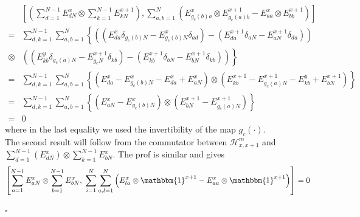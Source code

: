 \documentclass[10pt]{article}
\numberwithin{equation}{section}
\numberwithin{equation}{subsection}
\begin{document}
\begin{align*}
	&\left[\left(\sum_{d=1}^{N-1}E_{dN}^{x}\otimes\sum_{k=1}^{N-1}E_{kN}^{x+1}\right), \sum_{a,b=1}^{N}\left(E_{g_{c}(b)a}^{x}\otimes E_{g_{c}(a)b}^{x+1} -E_{aa}^{x}\otimes E_{bb}^{x+1}\right)\right]
	\\=&
	\sum_{d,k=1}^{N-1}\sum_{a,b=1}^{N}\left\{\left((E_{da}^{x}\delta_{g_{c}(b)N}-E_{g_{c}(b)N}^{x}\delta_{ad})-(E_{da}^{x+1}\delta_{aN}-E_{aN}^{x+1}\delta_{da})\right)\right. \\ \otimes&\left. \left((E_{kb}^{y}\delta_{g_{c}(a)N}-E_{g_{c}N}^{x+1}\delta_{kb})-(E_{kb}^{x+1}\delta_{bN}-E_{bN}^{x+1}\delta_{kb})\right)\right\}
	\\=&
	\sum_{d,k=1}^{N-1}\sum_{a,b=1}^{N}\left\{\left(E_{da}^{x}-E_{g_{c}(b)N}^{x}-E_{da}^{x}+E_{aN}^{x}\right)\otimes\left(E_{kb}^{x+1}-E_{g_{c}(a)N}^{x+1}-E_{kb}^{y}+E_{bN}^{x+1}\right)\right\}
	\\=&
	\sum_{d,k=1}^{N-1}\sum_{a,b=1}^{N}\left\{\left(E_{aN}^{x}-E_{g_{c}(b)N}^{x}\right)\otimes \left(E_{bN}^{x+1}-E_{g_{c}(a)N}^{x+1}\right)\right\}
	\\=&0
\end{align*}
where in the last equality we used the invertibility of the map $g_{c}(\cdot)$. \\
The second result will follow from the commutator between $\mathcal{H}_{x,x+1}^{m}$ and $\sum_{d=1}^{N-1}(E_{dN}^{x})\otimes \sum_{k=1}^{N-1}E_{bN}^{x}$. The prof is similar and gives
\begin{equation}
	\left[\sum_{a=1}^{N-1}E_{aN}^{x}\otimes \sum_{b=1}^{N-1}E_{bN}^{x},\;\sum_{i=1}^{N}\sum_{a,l=1}^{N}\left(E_{la}^{x}\otimes \mathbbm{1}^{x+1}-E_{aa}^{x}\otimes \mathbbm{1}^{x+1}\right)\right]=0
\end{equation}
\begin{flushright}
	$\square$
\end{flushright}
\end{document}
